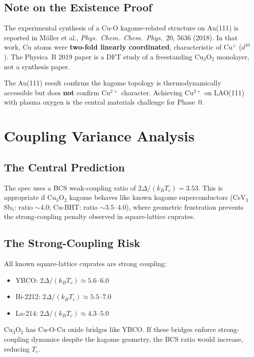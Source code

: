 \documentclass[11pt, a4paper]{article}
\begin{document}
\subsection{Note on the Existence Proof}

The experimental synthesis of a Cu-O kagome-related structure
on Au(111) is reported in M\"oller et al., \textit{Phys.\ Chem.\
Chem.\ Phys.}\ 20, 5636 (2018). In that work, Cu atoms were
\textbf{two-fold linearly coordinated}, characteristic of
Cu$^+$ ($d^{10}$). The Physica~B 2019 paper is a DFT study of
a freestanding Cu$_3$O$_2$ monolayer, not a synthesis paper.

The Au(111) result confirms the kagome topology is
thermodynamically accessible but does \textbf{not} confirm
Cu$^{2+}$ character. Achieving Cu$^{2+}$ on LAO(111) with
plasma oxygen is the central materials challenge for Phase~0.

\section{Coupling Variance Analysis}
\label{sec:variance}

\subsection{The Central Prediction}

The spec uses a BCS weak-coupling ratio of
$2\Delta/(k_BT_c) = 3.53$. This is appropriate if Cu$_3$O$_2$
kagome behaves like known kagome superconductors
(CsV$_3$Sb$_5$: ratio $\sim 4.0$; Cu-BHT: ratio
$\sim 3.5$--$4.0$), where geometric frustration prevents the
strong-coupling penalty observed in square-lattice cuprates.

\subsection{The Strong-Coupling Risk}

All known square-lattice cuprates are strong coupling:
\begin{itemize}[nosep]
  \item YBCO: $2\Delta/(k_BT_c) \approx 5.6$--$6.0$
  \item Bi-2212: $2\Delta/(k_BT_c) \approx 5.5$--$7.0$
  \item La-214: $2\Delta/(k_BT_c) \approx 4.3$--$5.0$
\end{itemize}

Cu$_3$O$_2$ has Cu-O-Cu oxide bridges like YBCO. If these
bridges enforce strong-coupling dynamics despite the kagome
geometry, the BCS ratio would increase, reducing $T_c$.
\end{document}
